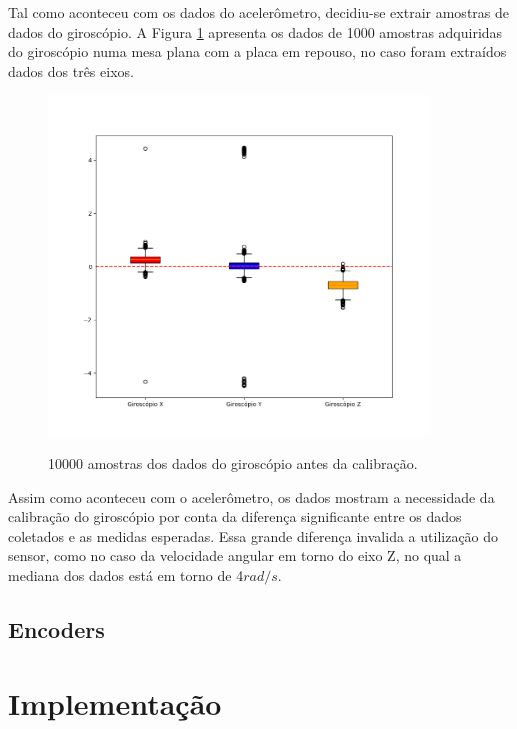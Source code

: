 \documentclass[acronym, symbols, table]{fei}
\begin{document}
					Tal como aconteceu com os dados do acelerômetro, decidiu-se extrair amostras de dados do giroscópio. A Figura \ref{fig:dados_giroscopio_errado} apresenta os dados de 1000 amostras adquiridas do giroscópio numa mesa plana com a placa em repouso, no caso foram extraídos dados dos três eixos.
				
					\begin{figure}[!htb]
						\centering
						\caption{10000 amostras dos dados do giroscópio antes da calibração.}
						\includegraphics[width=0.9\textwidth]{dados_giroscopio_errados.png}
						\label{fig:dados_giroscopio_errado}
					\end{figure}
					
					Assim como aconteceu com o acelerômetro, os dados mostram a necessidade da calibração do giroscópio por conta da diferença significante entre os dados coletados e as medidas esperadas. Essa grande diferença invalida a utilização do sensor, como no caso da velocidade angular em torno do eixo Z, no qual a mediana dos dados está em torno de 4$rad/s$.
			
			\subsection{Encoders}
		
		\section{Implementação}\label{sec:resultados_implementacao}
		
\end{document}
